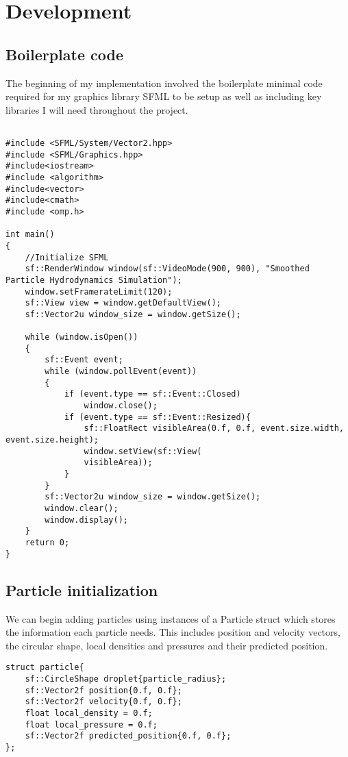 \documentclass[write-up.tex]{subfiles}
\begin{document}
\section{Development}
\subsection{Boilerplate code}

The beginning of my implementation involved the boilerplate minimal code required for my graphics library SFML to be setup as well as including key libraries I will need throughout the project.
\begin{lstlisting}

#include <SFML/System/Vector2.hpp>
#include <SFML/Graphics.hpp>
#include<iostream>
#include <algorithm>
#include<vector>
#include<cmath>
#include <omp.h>

int main()
{
    //Initialize SFML
    sf::RenderWindow window(sf::VideoMode(900, 900), "Smoothed Particle Hydrodynamics Simulation");
    window.setFramerateLimit(120);
    sf::View view = window.getDefaultView();
    sf::Vector2u window_size = window.getSize();

    while (window.isOpen())
    {
        sf::Event event;
        while (window.pollEvent(event))
        {
            if (event.type == sf::Event::Closed)
                window.close();
            if (event.type == sf::Event::Resized){
                sf::FloatRect visibleArea(0.f, 0.f, event.size.width, event.size.height);
                window.setView(sf::View(
                visibleArea));
            }
        }
        sf::Vector2u window_size = window.getSize();
        window.clear();
        window.display();
    }
    return 0;
}
\end{lstlisting}

\subsection{Particle initialization}
We can begin adding particles using instances of a Particle struct which stores the information each particle needs. This includes position and velocity vectors, the circular shape, local densities and pressures and their predicted position.

\begin{lstlisting}
struct particle{
    sf::CircleShape droplet{particle_radius};
    sf::Vector2f position{0.f, 0.f};
    sf::Vector2f velocity{0.f, 0.f};
    float local_density = 0.f;
    float local_pressure = 0.f;
    sf::Vector2f predicted_position{0.f, 0.f};
};
\end{lstlisting}
\end{document}
